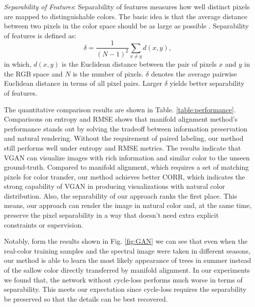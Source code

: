 \documentclass[10pt,conference,a4paper]{IEEEtran}
\begin{document}
\emph{Separability of Features}: Separability of features measures how
well distinct pixels are mapped to distinguishable colors. The
basic idea is that the average distance between two pixels in the
color space should be as large as possible \cite{cui2009interactive}.
Separability of features is defined as:
\begin{equation}\label{eq:separability}
  \delta= \frac{1}{(N-1)^2}\sum_{x\neq y}d(x,y),
\end{equation}
in which, $d(x,y)$ is the Euclidean distance between the pair of
pixels $x$ and $y$ in the RGB space and $N$ is the number of pixels.
$\delta$ denotes the average pairwise Euclidean distance in terms of
all pixel pairs. Larger $\delta$ yields better separability of
features.

The quantitative comparison results are shown in Table. \ref{table:performance}.
Comparisons on entropy and RMSE shows that manifold alignment method's performance stands out by solving the tradeoff between information preservation and natural rendering.
Without the requirement of paired labeling, our method still performs well under entropy and RMSE metrics. The results indicate that VGAN can visualize images with rich information and similar color to the unseen ground-truth.
Compared to manifold alignment, which requires a set of matching pixels for color transfer, our method achieves better CORR, which indicates the strong capability of VGAN in producing visualizations with natural color distribution. Also, the separability of our approach ranks the first place.
This means, our approach can render the image in natural color and, at the same time, preserve the pixel separability in a way that doesn't need extra explicit constraints or supervision.

Notably, form the results shown in Fig. \ref{fig:GAN} we can see that even when the real-color training samples and the spectral image were taken in different seasons, our method is able to learn the most likely appearance of trees in summer instead of the sallow color directly transferred by manifold alignment.
In our experiments we found that, the network without cycle-loss performs much worse in terms of separability. This meets our expectation since cycle-loss requires the separability be preserved so that the details can be best recovered.
\end{document}

